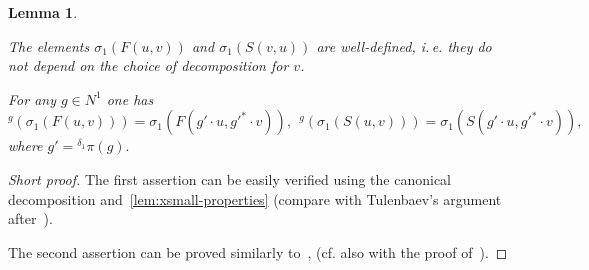 \documentclass[oneside, 10pt]{amsart}
\numberwithin{equation}{section}
\newtheorem{lemma}{Lemma}
\numberwithin{lemma}{section}
\theoremstyle{definition}
\theoremstyle{remark}
\begin{document}
\begin{lemma} \label{lem:cor-conj}
 \begin{lemlist}
   \item \label{item:correctness} The elements $\sigma_1(F(u, v))$ and $\sigma_1(S(v, u))$ are well-defined, i.\,e. they do not depend on the choice of decomposition for $v$.
   \item \label{item:conjugation} For any $g \in N^1$ one has 
      \begin{equation}
          \nonumber {}^g\left(\sigma_1(F(u, v))\right) = \sigma_1\left(F(g' \cdot u, {g'}^{*} \cdot v)\right),\ \ 
                    {}^g\left(\sigma_1(S(u, v))\right) = \sigma_1\left(S(g' \cdot u, {g'}^{*} \cdot v)\right),                    
      \end{equation}
      where $g' = {}^{\delta_1}\pi(g).$
 \end{lemlist}
\end{lemma}
\begin{proof}[Short proof]
 The first assertion can be easily verified using the canonical decomposition and~\cref{lem:xsmall-properties}
  (compare with Tulenbaev's argument after~\cite[Lemma~1.1]{Tu83}).
  
 The second assertion can be proved similarly to~\cite[3.14]{Ka77}, (cf. also with the proof of~\cite[Lemma~4.4d]{LS17}).
\end{proof}
\end{document}
